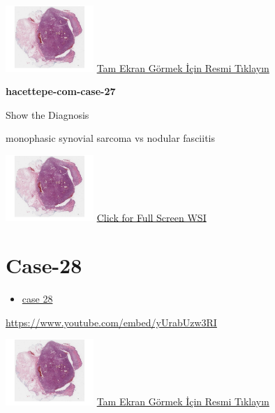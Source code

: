 \documentclass[
  letterpaper,
  paper=6in:9in,
  pagesize=pdftex,
  headinclude=on,
  footinclude=on,
  12pt]{scrbook}
\providecommand{\tightlist}{%
  \setlength{\itemsep}{0pt}\setlength{\parskip}{0pt}}\usepackage{longtable,booktabs,array}
\begin{document}
\href{https://images.patolojiatlasi.com/hacettepe-com-case-1/HE.html}{\includegraphics[width=0.25\textwidth,height=\textheight]{./screenshots/hacettepe-com-case-1_screenshot.png}}
\href{https://images.patolojiatlasi.com/hacettepe-com-case-27/HE1.html}{Tam
Ekran Görmek İçin Resmi Tıklayın}

\textbf{hacettepe-com-case-27}

Show the Diagnosis

\hypertarget{answe27}{}
monophasic synovial sarcoma vs nodular fasciitis

\href{https://images.patolojiatlasi.com/hacettepe-com-case-1/HE.html}{\includegraphics[width=0.25\textwidth,height=\textheight]{./screenshots/hacettepe-com-case-1_screenshot.png}}
\href{https://images.patolojiatlasi.com/hacettepe-com-case-27/HE1.html}{Click
for Full Screen WSI}

\hypertarget{sec-hacettepe-case-of-the-month-case-28}{%
\section{Case-28}\label{sec-hacettepe-case-of-the-month-case-28}}

\begin{itemize}
\tightlist
\item
  \href{https://www.youtube.com/watch?v=yUrabUzw3RI\&ab_channel=KemalKosemehmetoglu}{case
  28}
\end{itemize}

\url{https://www.youtube.com/embed/yUrabUzw3RI}

\href{https://images.patolojiatlasi.com/hacettepe-com-case-1/HE.html}{\includegraphics[width=0.25\textwidth,height=\textheight]{./screenshots/hacettepe-com-case-1_screenshot.png}}
\href{https://images.patolojiatlasi.com/hacettepe-com-case-28/HE1.html}{Tam
Ekran Görmek İçin Resmi Tıklayın}
\end{document}
